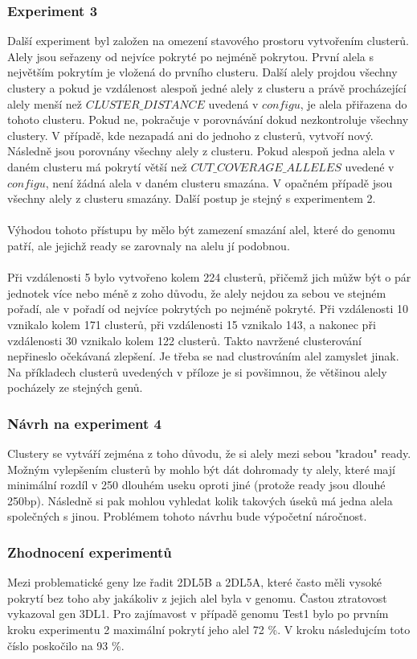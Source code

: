 \documentclass[czech,DP]{thesiskiv}
\numberwithin{equation}{section}
\begin{document}
\subsubsection{Experiment 3}
Další experiment byl založen na omezení stavového prostoru vytvořením clusterů. Alely jsou seřazeny od nejvíce pokryté po nejméně pokrytou. První alela s největším pokrytím je vložená do prvního clusteru. Další alely projdou všechny clustery a pokud je vzdálenost alespoň jedné alely z clusteru a právě procházející alely menší než $CLUSTER\_DISTANCE$ uvedená v $configu$, je alela přiřazena do tohoto clusteru. Pokud ne, pokračuje v porovnávání dokud nezkontroluje všechny clustery. V případě, kde nezapadá ani do jednoho z clusterů, vytvoří nový. Následně jsou porovnány všechny alely z clusteru. Pokud alespoň jedna alela v daném clusteru má pokrytí větší než $CUT\_COVERAGE\_ALLELES$ uvedené v $configu$, není žádná alela v daném clusteru smazána. V opačném případě jsou všechny alely z clusteru smazány. Další postup je stejný s experimentem 2. 
\\
\\
Výhodou tohoto přístupu by mělo být zamezení smazání alel, které do genomu patří, ale jejichž ready se zarovnaly na alelu jí podobnou. 
\\
\\
Při vzdálenosti 5 bylo vytvořeno kolem 224 clusterů, přičemž jich můžw být o pár jednotek více nebo méně z zoho důvodu, že alely nejdou za sebou ve stejném pořadí, ale v pořadí od nejvíce pokrytých po nejméně pokryté. Při vzdálenosti 10 vznikalo kolem 171 clusterů, při vzdálenosti 15 vznikalo 143, a nakonec při vzdálenosti 30 vznikalo kolem 122 clusterů. Takto navržené clusterování nepřineslo očekávaná zlepšení. Je třeba se nad clustrováním alel zamyslet jinak. Na příkladech clusterů uvedených v příloze je si povšimnou, že většinou alely pocházely ze stejných genů.


\subsubsection{Návrh na experiment 4}
Clustery se vytváří zejména z toho důvodu, že si alely mezi sebou "kradou" ready. Možným vylepšením clusterů by mohlo být dát dohromady ty alely, které mají minimální rozdíl v 250 dlouhém useku oproti jiné (protože ready jsou dlouhé 250bp). Následně si pak mohlou vyhledat kolik takových úseků má jedna alela společných s jinou. Problémem tohoto návrhu bude výpočetní náročnost.
 
\subsubsection{Zhodnocení experimentů}
Mezi problematické geny lze řadit 2DL5B a 2DL5A, které často měli vysoké pokrytí bez toho aby jakákoliv z jejich alel byla v genomu. Častou ztratovost vykazoval gen 3DL1. Pro zajímavost v případě genomu Test1 bylo po prvním kroku experimentu 2 maximální pokrytí jeho alel 72 \%. V kroku následujcím toto číslo poskočilo na 93 \%. 
\end{document}
